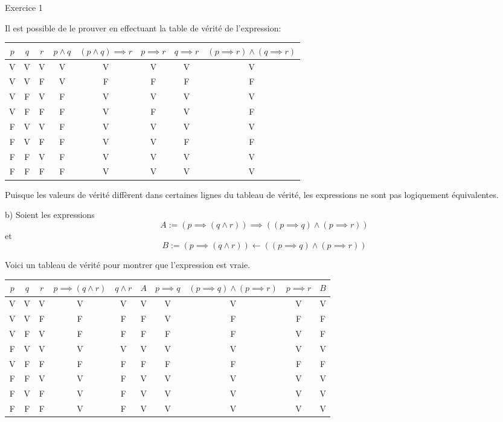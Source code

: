 \documentclass{article}
\begin{document}
Exercice 1

\vspace{0.5cm}
Il est possible de le prouver en effectuant la table de vérité de l'expression:

\begin{center}
\begin{tabular}{| c | c | c | c | c | c | c | c |}
\hline
$p$ & $q$ & $r$ & $p \land q$ & $(p \land q) \implies r$ & $p \implies r$ & $q \implies r$ & $(p \implies r) \land (q \implies r)$ \\
\hline
V & V & V & V & V & V & V & V\\
V & V & F & V & F & F & F & F\\
V & F & V & F & V & V & V & V\\
V & F & F & F & V & F & V & F\\
F & V & V & F & V & V & V & V\\
F & V & F & F & V & V & F & F\\
F & F & V & F & V & V & V & V\\
F & F & F & F & V & V & V & V\\
\hline
\end{tabular}
\end{center}

\vspace{0.5cm}

Puisque les valeurs de vérité diffèrent dans certaines lignes du tableau de vérité, les expressions ne sont pas logiquement équivalentes.

\vspace{0.5cm}

b) Soient les expressions 
$$A := (p \implies (q \land r)) \implies ((p \implies q) \land (p \implies r))$$ 
et 
$$B := (p \implies (q \land r)) \leftarrow ((p \implies q) \land (p \implies r))$$

Voici un tableau de vérité pour montrer que l'expression est vraie.

\begin{center}
\begin{tabular}{| c | c | c | c | c | c | c | c | c | c |}
\hline
$p$ & $q$ & $r$ & $p \implies (q \land r)$ & $q \land r$ & $A$ & $p \implies q$ & $(p \implies q) \land (p \implies r)$ & $p \implies r$ & $B$\\
\hline
V & V & V & V & V & V & V & V & V & V\\
V & V & F & F & F & F & V & F & F & F\\
V & F & V & F & F & F & F & F & V & F\\
F & V & V & V & V & V & V & V & V & V\\
V & F & F & F & F & F & F & F & F & F\\
F & F & V & V & F & V & V & V & V & V\\
F & V & F & V & F & V & V & V & V & V\\
F & F & F & V & F & V & V & V & V & V\\
\hline
\end{tabular}
\end{center}
\end{document}
